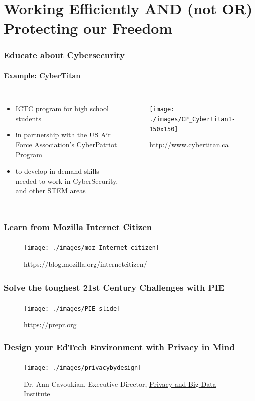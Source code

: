 \section[Section]{Working Efficiently AND (not OR) Protecting our Freedom}
	\begin{frame}
	\frametitle{Educate about Cybersecurity}
	\framesubtitle{Example: CyberTitan}
	\begin{columns}
			\begin{itemize}[<+->]
				\item ICTC program for high school students
				\item in partnership with the US Air Force Association’s CyberPatriot Program
				\item to develop in-demand skills needed to work in CyberSecurity, and other STEM areas
			\end{itemize}
	        	\begin{figure}[h]
                	\centering
                	\texttt{[image: ./images/CP\_Cybertitan1-150x150]}
			\caption{\url{http://www.cybertitan.ca}}
        		\end{figure}
	\end{columns}
	\end{frame}

	\begin{frame}
	\frametitle{Learn from Mozilla Internet Citizen}
	\framesubtitle{}
	        \begin{figure}[h]
                \centering
                \texttt{[image: ./images/moz-Internet-citizen]}
		\caption{\url{https://blog.mozilla.org/internetcitizen/}}
        	\end{figure}
	\end{frame}

	\begin{frame}
	\frametitle{Solve the toughest 21st Century Challenges with PIE\tiny\textsuperscript{\textregistered}}
	\framesubtitle{}
	        \begin{figure}[h]
                \centering
                \texttt{[image: ./images/PIE\_slide]}
		\caption{\url{https://prepr.org}}
        	\end{figure}
	\end{frame}

	\begin{frame}
	\frametitle{Design your EdTech Environment with Privacy in Mind}
	\framesubtitle{}
	       	\begin{figure}[h]
               	\centering
               	\texttt{[image: ./images/privacybydesign]}
		\caption{Dr. Ann Cavoukian, Executive Director, \href{http://www.ryerson.ca/pbdi/privacy-by-design/certification/TheSevenFoundationalPrinciplesofPrivacybyDesign/}{Privacy and Big Data Institute}}
        	\end{figure}
	\end{frame}

